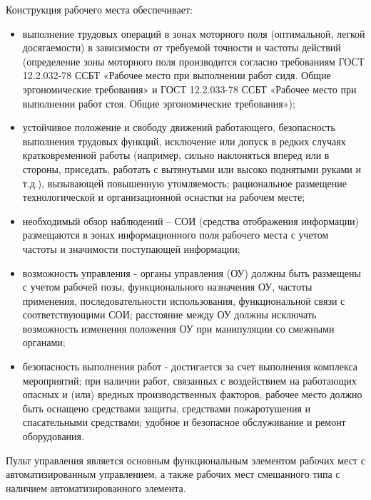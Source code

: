        Конструкция рабочего места обеспечивает:
        \begin{itemize}
            \item выполнение трудовых операций в зонах моторного поля
                (оптимальной, легкой досягаемости) в зависимости от требуемой
                точности и частоты действий (определение зоны моторного поля
                производится согласно требованиям ГОСТ 12.2.032-78 ССБТ
                «Рабочее место при выполнении работ сидя. Общие эргономические
                требования» и ГОСТ 12.2.033-78 ССБТ «Рабочее место при
                выполнении работ стоя.  Общие эргономические требования»);
            \item устойчивое положение и свободу движений работающего,
                безопасность выполнения трудовых функций, исключение или допуск
                в редких случаях кратковременной работы (например, сильно
                наклоняться вперед или в стороны, приседать, работать с
                вытянутыми или высоко поднятыми руками и т.д.), вызывающей
                повышенную утомляемость; рациональное размещение
                технологической и  организационной оснастки на рабочем месте;
            \item необходимый обзор наблюдений – СОИ (средства отображения
                информации) размещаются в зонах информационного поля рабочего
                места с учетом частоты и значимости поступающей информации;
            \item возможность управления - органы управления (ОУ) должны быть
                размещены с учетом рабочей позы, функционального назначения ОУ,
                частоты применения, последовательности использования,
                функциональной связи с соответствующими СОИ; расстояние между
                ОУ должны исключать возможность изменения положения ОУ при
                манипуляции со смежными органами;
            \item безопасность выполнения работ - достигается за счет
                выполнения комплекса мероприятий; при наличии работ, связанных
                с воздействием на работающих опасных и (или) вредных
                производственных факторов, рабочее место должно быть оснащено
                средствами защиты, средствами пожаротушения и спасательными
                средствами; удобное и безопасное обслуживание и ремонт
                оборудования.
        \end{itemize}

        Пульт управления является основным функциональным элементом рабочих
        мест с автоматизированным управлением, а также рабочих мест смешанного
        типа с наличием автоматизированного элемента.

